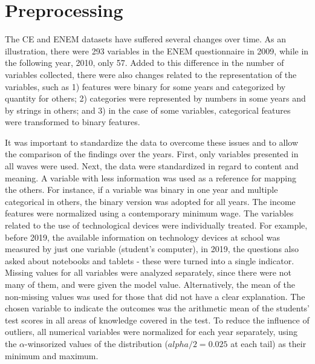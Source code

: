 \section{Preprocessing}

The CE and ENEM datasets have suffered several changes over time. As an illustration, there were 293 variables in the ENEM questionnaire in 2009, while in the following year, 2010, only 57. Added to this difference in the number of variables collected, there were also changes related to the representation of the variables, such as 1) features were binary for some years and categorized by quantity for others; 2) categories were represented by numbers in some years and by strings in others; and 3) in the case of some variables, categorical features were transformed to binary features.  

It was important to standardize the data to overcome these issues and to allow the comparison of the findings over the years. First, only variables presented in all waves were used. Next, the data were standardized in regard to content and meaning. A variable with less information was used as a reference for mapping the others. For instance, if a variable was binary in one year and multiple categorical in others, the binary version was adopted for all years. The income features were normalized using a contemporary minimum wage. The variables related to the use of technological devices were individually treated. For example, before 2019, the available information on technology devices at school was measured by just one variable (student’s computer), in 2019, the questions also asked about notebooks and tablets - these were turned into a single indicator. Missing values for all variables were analyzed separately, since there were not many of them, and were given the model value. Alternatively, the mean of the non-missing values was used for those that did not have a clear explanation. The chosen variable to indicate the outcomes was the arithmetic mean of the students’ test scores in all areas of knowledge covered in the test. To reduce the influence of outliers, all numerical variables were normalized for each year separately, using the \(\alpha\)-winsorized values of the distribution (\(alpha/2 = 0.025\) at each tail) as their minimum and maximum. 

